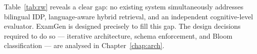 \begin{table}[H]
\centering
\caption{ExamGen vs.\ reference systems.}
\label{tab:rw}
\end{table}

Table~\ref{tab:rw} reveals a clear gap: no existing system simultaneously addresses
bilingual IDP, language-aware hybrid retrieval, and an independent cognitive-level
evaluator.
ExamGen is designed precisely to fill this gap.
The design decisions required to do so --- iterative architecture, schema enforcement,
and Bloom classification --- are analysed in Chapter~\ref{chap:arch}.
